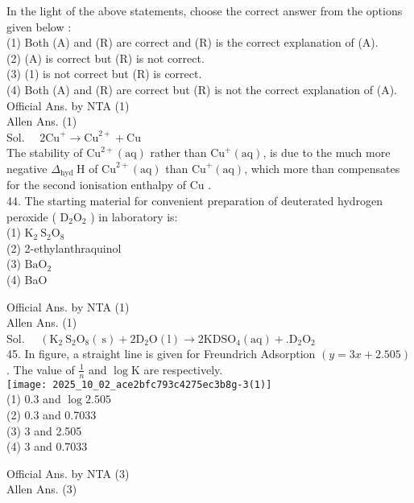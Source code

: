 \documentclass[10pt]{article}
\begin{document}
In the light of the above statements, choose the correct answer from the options given below :\\
(1) Both (A) and (R) are correct and (R) is the correct explanation of (A).\\
(2) (A) is correct but (R) is not correct.\\
(3) (1) is not correct but (R) is correct.\\
(4) Both (A) and (R) are correct but (R) is not the correct explanation of (A).\\
Official Ans. by NTA (1)\\
Allen Ans. (1)\\
Sol. \(\quad 2 \mathrm{Cu}^{+} \rightarrow \mathrm{Cu}^{2+}+\mathrm{Cu}\)\\
The stability of \(\mathrm{Cu}^{2+}(\mathrm{aq})\) rather than \(\mathrm{Cu}^{+}(\mathrm{aq})\), is due to the much more negative \(\Delta_{\text {hyd }} \mathrm{H}\) of \(\mathrm{Cu}^{2+}(\mathrm{aq})\) than \(\mathrm{Cu}^{+}(\mathrm{aq})\), which more than compensates for the second ionisation enthalpy of Cu .\\
44. The starting material for convenient preparation of deuterated hydrogen peroxide ( \(\mathrm{D}_{2} \mathrm{O}_{2}\) ) in laboratory is:\\
(1) \(\mathrm{K}_{2} \mathrm{~S}_{2} \mathrm{O}_{8}\)\\
(2) 2-ethylanthraquinol\\
(3) \(\mathrm{BaO}_{2}\)\\
(4) BaO

Official Ans. by NTA (1)\\
Allen Ans. (1)\\
Sol. \(\quad\left(\mathrm{K}_{2} \mathrm{~S}_{2} \mathrm{O}_{8}(\mathrm{~s})+2 \mathrm{D}_{2} \mathrm{O}(\mathrm{l}) \rightarrow 2 \mathrm{KDSO}_{4}(\mathrm{aq})+.\mathrm{D}_{2} \mathrm{O}_{2}\right.\)\\
45. In figure, a straight line is given for Freundrich Adsorption \((y=3 x+2.505)\). The value of \(\frac{1}{n}\) and \(\log \mathrm{K}\) are respectively.\\
\texttt{[image: 2025\_10\_02\_ace2bfc793c4275ec3b8g-3(1)]}\\
(1) 0.3 and \(\log 2.505\)\\
(2) 0.3 and 0.7033\\
(3) 3 and 2.505\\
(4) 3 and 0.7033

Official Ans. by NTA (3)\\
Allen Ans. (3)
\end{document}

